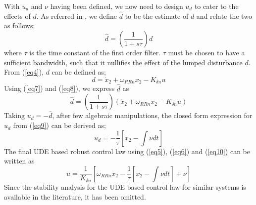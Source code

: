 \documentclass[conference]{IEEEtran}
\begin{document}
With $u_a$ and $\nu$ having been defined, we now need to design $u_d$ to cater to the effects of $d$.
As referred in \cite{zhong2004}, we define $\hat d$ to be the estimate of $d$ and relate the two as follows;
%
\begin{equation}
\hat d = \left( \frac{1}{1 + s\tau}\right)d
\label{eq7}
\end{equation}
%
where $\tau$ is the time constant of the first order filter. $\tau$ must be chosen to have a sufficient bandwidth, such that it nullifies the effect of the lumped disturbance $d$. From (\ref{eq4}), $d$ can be defined as;
%
\begin{equation}
d = \dot{x}_2 + \omega_{RRn}x_2 - K_{\delta n}u
\label{eq8}
\end{equation}
%
Using (\ref{eq7}) and (\ref{eq8}), we express $\hat{d}$ as
%
\begin{equation}
\hat d = \left( \frac{1}{1 + s\tau}\right)\left(\dot{x}_2 + \omega_{RRn}x_2 - K_{\delta n}u\right)
\label{eq9}
\end{equation}
%
Taking $u_d = -\hat d$, after few algebraic manipulations, the closed form expression for $u_d$ from (\ref{eq9}) can be derived as;
%
\begin{equation}
u_d= - \frac{1}{\tau}\left[x_2 - \int \nu dt\right]
\label{eq10}
\end{equation}
%
The final UDE based robust control law using (\ref{eq5}), (\ref{eq6}) and (\ref{eq10}) can be written as
%
\begin{equation}
u =  \frac{1}{K_{\delta n}}\left[\omega_{RRn}x_2  - \frac{1}{\tau}\left[x_2 - \int \nu dt\right]+\nu\right]
\label{eq11}
\end{equation}
%
Since the stability analysis for the UDE based control law for similar systems is available in the literature, it has been omitted.
\end{document}
